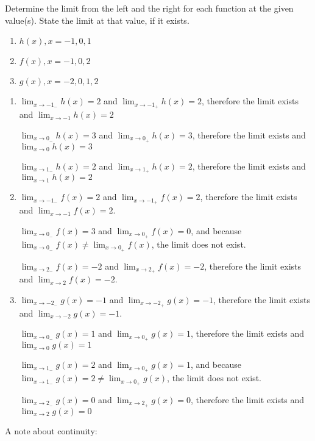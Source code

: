\begin{Exercise}[title = Limits Practice 4, label=limits4]
Determine the limit from the left and the right for each function at the given value(s). State the limit at that value, if it exists.
    \begin{enumerate}
    \item $h(x), x=-1, 0, 1$
    \item $f(x), x=-1, 0, 2$
    \item $g(x), x=-2, 0, 1, 2$
\end{enumerate}
\end{Exercise}
\begin{Answer}[ref=limits4]
    \begin{enumerate}
    \item $\lim_{x\to-1_-}h(x) = 2$ and $\lim_{x\to-1_+}h(x)=2$, therefore the limit exists and $\lim_{x\to-1}h(x)=2$

    $\lim_{x\to0_-}h(x) = 3$ and $\lim_{x\to0_+}h(x)=3$, therefore the limit exists and $\lim_{x\to0}h(x)=3$

    $\lim_{x\to1_-}h(x) = 2$ and $\lim_{x\to1_+}h(x)=2$, therefore the limit exists and $\lim_{x\to1}h(x)=2$
    \item $\lim_{x\to-1_-}f(x)=2$ and $\lim_{x\to-1_+}f(x)=2$, therefore the limit exists and $\lim_{x\to-1}f(x) = 2$.

    $\lim_{x\to0_-}f(x) = 3$ and $\lim_{x\to0_+}f(x) = 0$, and because $\lim_{x\to0_-}f(x) \neq \lim_{x\to0_+}f(x)$, the limit does not exist.

    $\lim_{x\to2_-}f(x) = -2$ and $\lim_{x\to2_+}f(x) = -2$, therefore the limit exists and $\lim_{x\to2}f(x) = -2$.

    \item $\lim_{x\to-2_-}g(x) = -1$ and $\lim_{x\to-2_+}g(x) = -1$, therefore the limit exists and $\lim_{x\to-2}g(x) = -1$.

    $\lim_{x\to0_-}g(x)=1$ and $\lim_{x\to0_+}g(x) = 1$, therefore the limit exists and $\lim_{x\to0}g(x) = 1$

    $\lim_{x\to1_-}g(x) = 2$ and $\lim_{x\to0_+}g(x) = 1$, and because $\lim_{x\to1_-}g(x) = 2 \neq \lim_{x\to0_+}g(x)$, the limit does not exist.

    $\lim_{x\to2_-}g(x) = 0$ and $\lim_{x\to2_+}g(x) = 0$, therefore the limit exists and $\lim_{x\to2}g(x) = 0$
\end{enumerate}
\end{Answer}

A note about continuity:

